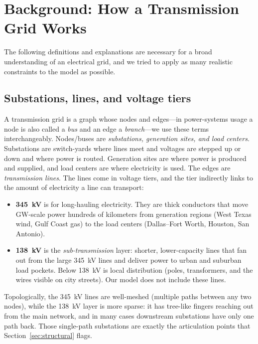 \documentclass[12pt,letterpaper]{article}
\begin{document}
\section{Background: How a Transmission Grid Works}
\label{sec:background}

The following definitions and explanations are necessary for a broad understanding of an electrical grid, and we tried to apply as many realistic constraints to the model as possible.

\subsection{Substations, lines, and voltage tiers}

A transmission grid is a graph whose nodes and edges---in power-systems usage a node is also called a \emph{bus} and an edge a \emph{branch}---we use these terms interchangeably. Nodes/buses are \emph{substations, generation sites, and load centers}. Substations are switch-yards where lines meet and voltages are stepped up or down and where power is routed. Generation sites are where power is produced and supplied, and load centers are where electricity is used. The edges are \emph{transmission lines}. The lines come in voltage tiers, and the tier indirectly links to the amount of electricity a line can transport:

\begin{itemize}
    \item \textbf{345~kV} is for long-hauling electricity. They are thick conductors that move GW-scale power hundreds of kilometers from generation regions (West Texas wind, Gulf Coast gas) to the load centers (Dallas--Fort Worth, Houston, San Antonio).
    \item \textbf{138~kV} is the \emph{sub-transmission} layer: shorter, lower-capacity lines that fan out from the large 345~kV lines and deliver power to urban and suburban load pockets. Below 138~kV is local distribution (poles, transformers, and the wires visible on city streets). Our model does not include these lines.
\end{itemize}

Topologically, the 345~kV lines are well-meshed (multiple paths between any two nodes), while the 138~kV layer is more sparse: it has tree-like fingers reaching out from the main network, and in many cases downstream substations have only one path back. Those single-path substations are exactly the articulation points that Section~\ref{sec:structural} flags.
\end{document}
